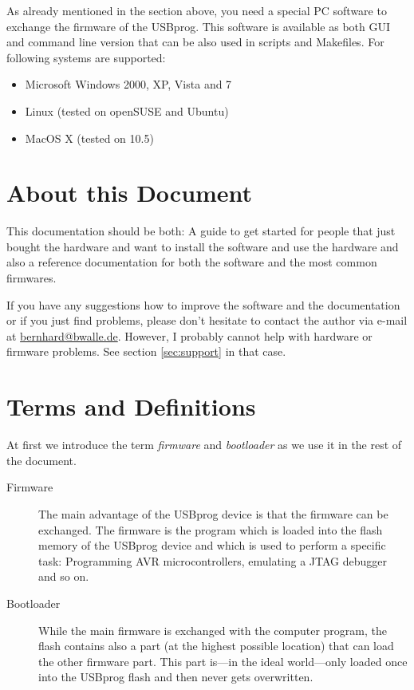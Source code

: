 \documentclass[bibtotoc,UKenglish,halfparskip,oneside,DIV12]{scrreprt}
\begin{document}
As already mentioned in the section above, you need a special PC software to exchange the firmware
of the USBprog. This software is available as both GUI and command line version that can be also
used in scripts and Makefiles. For following systems are supported:

\begin{itemize}
  \item Microsoft Windows 2000, XP, Vista and 7
  \item Linux (tested on openSUSE and Ubuntu)
  \item MacOS X (tested on 10.5)
\end{itemize}

\section{About this Document}

This documentation should be both: A guide to get started for people that just bought the hardware
and want to install the software and use the hardware and also a reference documentation for both
the software and the most common firmwares.

If you have any suggestions how to improve the software and the documentation or if you just find
problems, please don't hesitate to contact the author via e-mail at \url{bernhard@bwalle.de}.
However, I probably cannot help with hardware or firmware problems. See section \vref{sec:support}
in that case.

\section{Terms and Definitions}
\label{sec:definitions}

At first we introduce the term \emph{firmware} and \emph{bootloader} as we use it in the rest of the
document.

\begin{description}
  \item[Firmware] The main advantage of the USBprog device is that the firmware can be exchanged.
    The firmware is the program which is loaded into the flash memory of the USBprog device and
    which is used to perform a specific task: Programming AVR microcontrollers, emulating a JTAG
    debugger and so on.

  \item[Bootloader] While the main firmware is exchanged with the computer program, the flash
    contains also a part (at the highest possible location) that can load the other firmware part.
    This part is---in the ideal world---only loaded once into the USBprog flash and then never gets
    overwritten.
\end{description}
\end{document}
